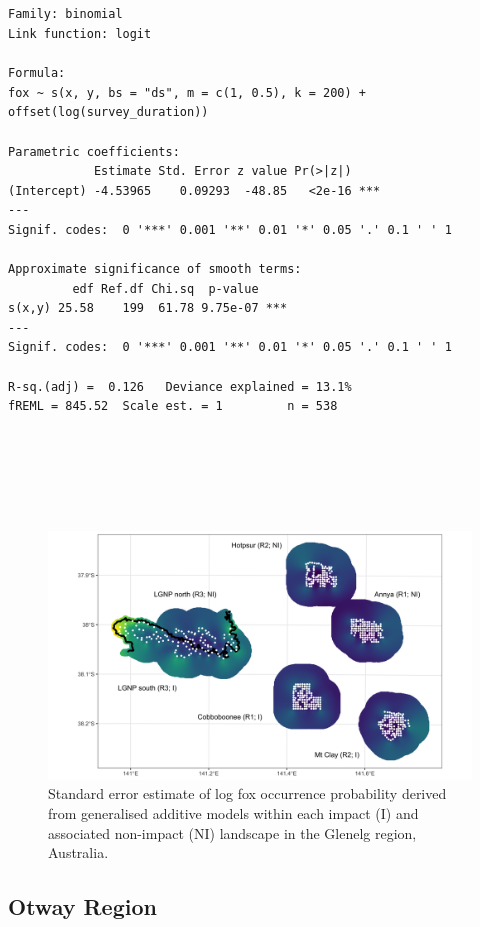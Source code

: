 \documentclass[11pt,a4paper,titlepage,twoside,openright]{style/unimelbthesis}
\begin{document}
\begin{mainmatter}
\(~\)

\(~\)

\(~\)
\begin{verbatim}

Family: binomial 
Link function: logit 

Formula:
fox ~ s(x, y, bs = "ds", m = c(1, 0.5), k = 200) + offset(log(survey_duration))

Parametric coefficients:
            Estimate Std. Error z value Pr(>|z|)    
(Intercept) -4.53965    0.09293  -48.85   <2e-16 ***
---
Signif. codes:  0 '***' 0.001 '**' 0.01 '*' 0.05 '.' 0.1 ' ' 1

Approximate significance of smooth terms:
         edf Ref.df Chi.sq  p-value    
s(x,y) 25.58    199  61.78 9.75e-07 ***
---
Signif. codes:  0 '***' 0.001 '**' 0.01 '*' 0.05 '.' 0.1 ' ' 1

R-sq.(adj) =  0.126   Deviance explained = 13.1%
fREML = 845.52  Scale est. = 1         n = 538
\end{verbatim}
\newpage

\(~\)

\(~\)

\(~\)
\begin{figure}

{\centering \includegraphics[width=1\linewidth]{figure/fox_occ_se_glenelg_600dpi} 

}

\caption{Standard error estimate of log fox occurrence probability derived from generalised additive models within each impact (I) and associated non-impact (NI) landscape in the Glenelg region, Australia.}\label{fig:density-fox-se-g}
\end{figure}
\newpage

\hypertarget{otway-region-1}{%
\subsection{Otway Region}\label{otway-region-1}}


\end{mainmatter}
\end{document}
